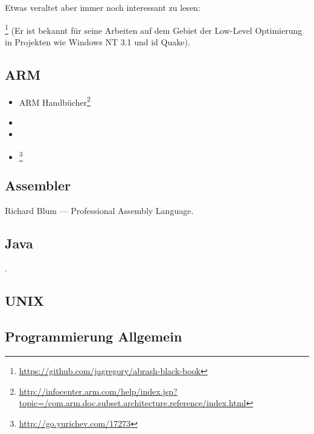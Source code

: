 Etwas veraltet aber immer noch interessant zu lesen:

\MAbrash\footnote{\AlsoAvailableAs \url{https://github.com/jagregory/abrash-black-book}}
(Er ist bekannt für seine Arbeiten auf dem Gebiet der Low-Level Optimierung in Projekten wie Windows NT 3.1 und id Quake).

\subsection{ARM}

\begin{itemize}
\item ARM Handbücher\footnote{\AlsoAvailableAs \url{http://infocenter.arm.com/help/index.jsp?topic=/com.arm.doc.subset.architecture.reference/index.html}}

\item \ARMSevenRef

\item \ARMSixFourRefURL

\item \ARMCookBook\footnote{\AlsoAvailableAs \url{http://go.yurichev.com/17273}}
\end{itemize}

\subsection{Assembler}

Richard Blum --- Professional Assembly Language.

\subsection{Java}

\JavaBook.

\subsection{UNIX}

\TAOUP

\subsection{Programmierung Allgemein}

